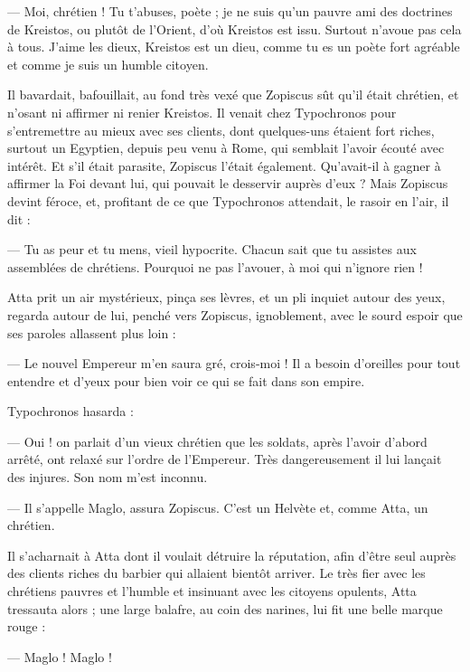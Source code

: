 \documentclass[a4paper, 11pt, oneside, polutonikogreek, french]{article}
\begin{document}
--- Moi, chrétien ! Tu t'abuses, poète ; je ne suis qu'un pauvre ami des doctrines de Kreistos, ou plutôt de l'Orient, d'où Kreistos est issu. Surtout n'avoue pas cela à tous. J'aime les dieux, Kreistos est un dieu, comme tu es un poète fort agréable et comme je suis un humble citoyen.

Il bavardait, bafouillait, au fond très vexé que Zopiscus sût qu'il était chrétien, et n'osant ni affirmer ni renier Kreistos. Il venait chez Typochronos pour s'entremettre au mieux avec ses clients, dont quelques-uns étaient fort riches, surtout un Egyptien, depuis peu venu à Rome, qui semblait l'avoir écouté avec intérêt. Et s'il était parasite, Zopiscus l'était également. Qu'avait-il à gagner à affirmer la Foi devant lui, qui pouvait le desservir auprès d'eux ? Mais Zopiscus devint féroce, et, profitant de ce que Typochronos attendait, le rasoir en l'air, il dit :

--- Tu as peur et tu mens, vieil hypocrite. Chacun sait que tu assistes aux assemblées de chrétiens. Pourquoi ne pas l'avouer, à moi qui n'ignore rien !

Atta prit un air mystérieux, pinça ses lèvres, et un pli inquiet autour des yeux, regarda autour de lui, penché vers Zopiscus, ignoblement, avec le sourd espoir que ses paroles allassent plus loin :

--- Le nouvel Empereur m'en saura gré, crois-moi ! Il a besoin d'oreilles pour tout entendre et d'yeux pour bien voir ce qui se fait dans son empire.

Typochronos hasarda :

--- Oui ! on parlait d'un vieux chrétien que les soldats, après l'avoir d'abord arrêté, ont relaxé sur l'ordre de l'Empereur. Très dangereusement il lui lançait des injures. Son nom m'est inconnu.

--- Il s'appelle Maglo, assura Zopiscus. C'est un Helvète et, comme Atta, un chrétien.

Il s'acharnait à Atta dont il voulait détruire la réputation, afin d'être seul auprès des clients riches du barbier qui allaient bientôt arriver. Le très fier avec les chrétiens pauvres et l'humble et insinuant avec les citoyens opulents, Atta tressauta alors ; une large balafre, au coin des narines, lui fit une belle marque rouge :

--- Maglo ! Maglo !
\end{document}
